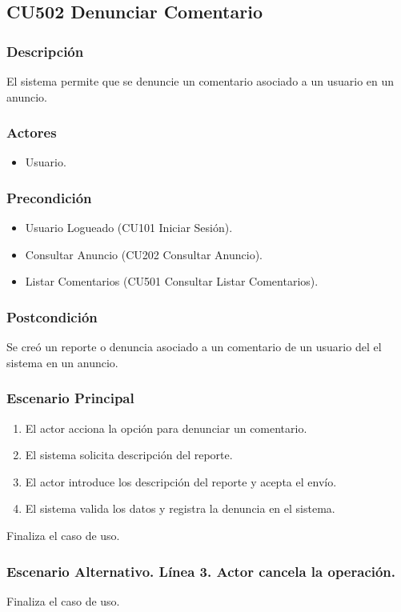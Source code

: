 \subsection{CU502 Denunciar Comentario}
\subsubsection{Descripci\'{o}n}
El sistema permite que se denuncie un comentario asociado a un usuario en un anuncio.
\subsubsection{Actores}
\begin{itemize}
\item Usuario.
\end{itemize}
\subsubsection{Precondici\'{o}n}
\begin{itemize}
\item Usuario Logueado (CU101 Iniciar Sesi\'{o}n).
\item Consultar Anuncio (CU202 Consultar Anuncio).
\item Listar Comentarios (CU501 Consultar Listar Comentarios).
\end{itemize}
\subsubsection{Postcondici\'{o}n}
Se cre\'{o} un reporte o denuncia asociado a un comentario de un usuario del el sistema en un anuncio.
\subsubsection{Escenario Principal}
\begin{enumerate}
\item El actor acciona la opci\'{o}n para denunciar un comentario.
\item El sistema solicita descripci\'{o}n del reporte.
\item El actor introduce los descripci\'{o}n del reporte y acepta el env\'{i}o.
\item El sistema valida los datos y registra la denuncia en el sistema.
\end{enumerate}
Finaliza el caso de uso.
\subsubsection{Escenario Alternativo. L\'{i}nea 3. Actor cancela la operaci\'{o}n.}
Finaliza el caso de uso.
